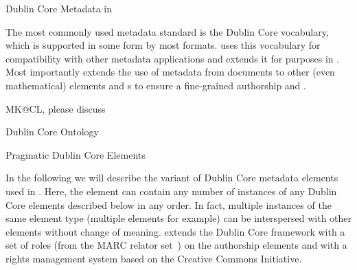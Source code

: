 
\begin{module}[id=dc-elements]
  \begin{omgroup}[id=dc-elements]{Dublin Core Metadata in {\omdoc}}

The most commonly used metadata standard is the Dublin Core vocabulary, which is
supported in some form by most formats. {\omdoc} uses this vocabulary for compatibility
with other metadata applications and extends it for {}
purposes in {\omdoc}.  Most importantly {\omdoc} extends the use of metadata from
documents to other (even mathematical) elements and {s} to
ensure a fine-grained authorship and {}.


\begin{newpart}{MK@CL, please discuss}
\begin{omgroup}{Dublin Core Ontology}

\end{omgroup}

\begin{omgroup}{Pragmatic Dublin Core Elements}

In the following we will describe the variant of Dublin Core metadata elements used in
{\omdoc}.  Here, the {} element can contain any number of instances of
any Dublin Core elements described below in any order. In fact, multiple instances of the
same element type (multiple {} elements for example) can be
interspersed with other elements without change of meaning.  {\omdoc} extends the Dublin
Core framework with a set of roles (from the MARC relator set~\cite{Marc:relators03}) on
the authorship elements and with a rights management system based on the Creative Commons
Initiative.



\end{omgroup}
\end{newpart}
\end{omgroup}
\end{module}

